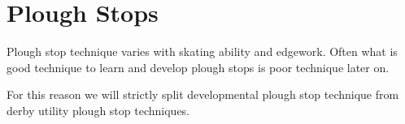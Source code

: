 \section{Plough Stops}
\label{sec:stopping/plough}

Plough stop technique varies with skating ability and edgework.  
Often what is good technique to learn and develop plough stops is poor technique later on.  

For this reason we will strictly split developmental plough stop technique from derby utility plough stop techniques. 


